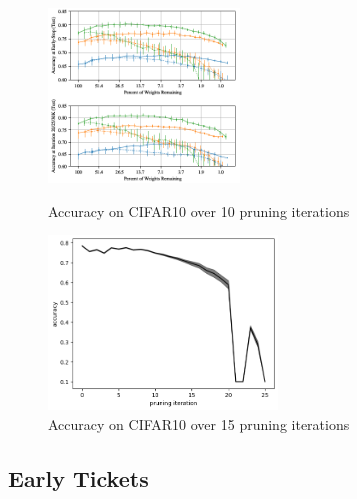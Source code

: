 \begin{figure}
	\begin{minipage}{0.5\textwidth}
		\centering
		\includegraphics[height=175px]{gfx/7-Evaluation/LTH_CNN.png}
		\caption*{Accuracy on CIFAR10 over 10 pruning iterations}
		\label{fig:CIFAR10accuracy10}
	\end{minipage}\hfill
	\begin{minipage}{0.5\textwidth}
		\centering
		\includegraphics[height=175px]{gfx/Experiments/Reproduction-CIFAR10-CNN/accuracy/converged.png}
		\caption*{Accuracy on CIFAR10 over 15 pruning iterations}
		\label{fig:CIFAR10accuracy15}
	\end{minipage}
\end{figure}
\subsection*{Early Tickets}
